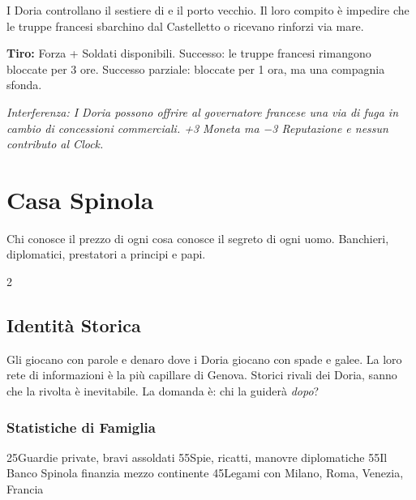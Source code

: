 I Doria controllano il sestiere di  e il porto vecchio. Il loro compito è impedire
che le truppe francesi sbarchino dal Castelletto o ricevano rinforzi via mare.

\textbf{Tiro:} Forza + Soldati disponibili. Successo: le truppe francesi rimangono
bloccate per 3 ore. Successo parziale: bloccate per 1 ora, ma una compagnia sfonda.

\textit{Interferenza: I Doria possono offrire al governatore francese una via di fuga
in cambio di concessioni commerciali. +3 Moneta ma −3 Reputazione e nessun contributo al Clock.}

\chapter{Casa Spinola}
\label{ch:spinola}


%
  {Chi conosce il prezzo di ogni cosa conosce il segreto di ogni uomo.}%
  {Banchieri, diplomatici, prestatori a principi e papi.}

\begin{multicols}{2}

\section{Identità Storica}
\label{sec:spinola-identita}

Gli  giocano con parole e denaro dove i Doria giocano con spade e galee.
La loro rete di informazioni è la più capillare di Genova.
Storici rivali dei Doria, sanno che la rivolta è inevitabile.
La domanda è: chi la guiderà \textit{dopo}?

\columnbreak

\subsection{Statistiche di Famiglia}


     {2}{5}{Guardie private, bravi assoldati}
   {5}{5}{Spie, ricatti, manovre diplomatiche}
 {5}{5}{Il Banco Spinola finanzia mezzo continente}
 {4}{5}{Legami con Milano, Roma, Venezia, Francia}

\end{multicols}

